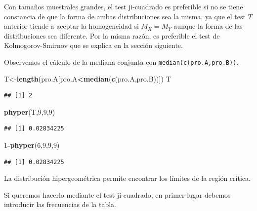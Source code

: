 \documentclass[
]{article}
\newenvironment{Shaded}{\begin{snugshade}}{\end{snugshade}}
\newcommand{\DecValTok}[1]{\textcolor[rgb]{0.00,0.00,0.81}{#1}}
\newcommand{\FunctionTok}[1]{\textcolor[rgb]{0.13,0.29,0.53}{\textbf{#1}}}
\newcommand{\NormalTok}[1]{#1}
\newcommand{\OtherTok}[1]{\textcolor[rgb]{0.56,0.35,0.01}{#1}}
\newcommand{\SpecialCharTok}[1]{\textcolor[rgb]{0.81,0.36,0.00}{\textbf{#1}}}
\begin{document}
Con tamaños muestrales grandes, el test ji-cuadrado es preferible si no se tiene constancia de que la forma de ambas distribuciones sea la misma, ya que el test \(T\) anterior tiende a aceptar la homogeneidad si \(M_{X}=M_{Y}\) aunque la forma de las distribuciones sea diferente.
Por la misma razón, es preferible el test de Kolmogorov-Smirnov que se explica en la sección siguiente.

Observemos el cálculo de la mediana conjunta con \texttt{median(c(pro.A,pro.B))}.

\begin{Shaded}
\begin{Highlighting}[]
\NormalTok{T}\OtherTok{\textless{}{-}}\FunctionTok{length}\NormalTok{(pro.A[pro.A}\SpecialCharTok{\textless{}}\FunctionTok{median}\NormalTok{(}\FunctionTok{c}\NormalTok{(pro.A,pro.B))])}
\NormalTok{T}
\end{Highlighting}
\end{Shaded}

\begin{verbatim}
## [1] 2
\end{verbatim}

\begin{Shaded}
\begin{Highlighting}[]
\FunctionTok{phyper}\NormalTok{(T,}\DecValTok{9}\NormalTok{,}\DecValTok{9}\NormalTok{,}\DecValTok{9}\NormalTok{)}
\end{Highlighting}
\end{Shaded}

\begin{verbatim}
## [1] 0.02834225
\end{verbatim}

\begin{Shaded}
\begin{Highlighting}[]
\DecValTok{1}\SpecialCharTok{{-}}\FunctionTok{phyper}\NormalTok{(}\DecValTok{6}\NormalTok{,}\DecValTok{9}\NormalTok{,}\DecValTok{9}\NormalTok{,}\DecValTok{9}\NormalTok{)}
\end{Highlighting}
\end{Shaded}

\begin{verbatim}
## [1] 0.02834225
\end{verbatim}

La distribución hipergeométrica permite encontrar los límites de la región crítica.

Si queremos hacerlo mediante el test ji-cuadrado, en primer lugar debemos introducir las frecuencias de la tabla.
\end{document}
